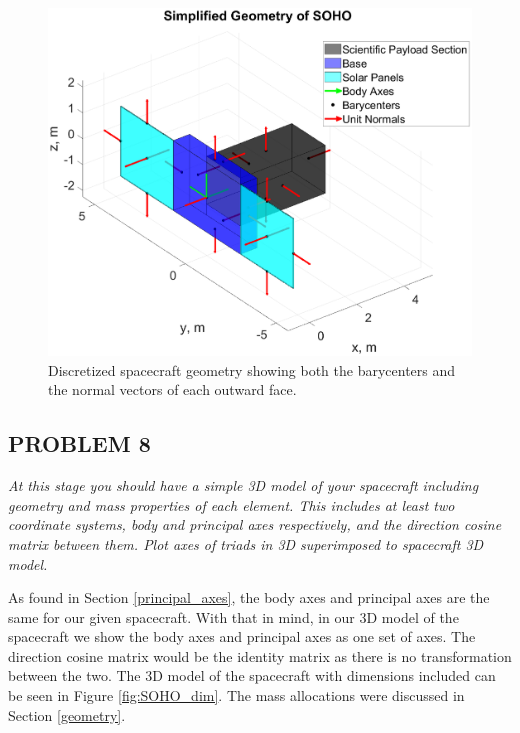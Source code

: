 \documentclass[12pt,a4paper,notitlepage]{article}
\begin{document}
\begin{figure}[H]
  \centering
    \includegraphics[width=\textwidth]{Images/SOHO_geo.eps}
  \caption{Discretized spacecraft geometry showing both the barycenters and the normal vectors of each outward face.}
  \label{fig:SOHO_disc}
\end{figure}

\subsection{PROBLEM 8}
\textit{At this stage you should have a simple 3D model of your spacecraft including geometry and mass properties of each element. This includes at least two coordinate systems, body and principal axes respectively, and the direction cosine matrix between them. Plot axes of triads in 3D superimposed to spacecraft 3D model.}

As found in Section \ref{principal_axes}, the body axes and principal axes are the same for our given spacecraft. With that in mind, in our 3D model of the spacecraft we show the body axes and principal axes as one set of axes. The direction cosine matrix would be the identity matrix as there is no transformation between the two. The 3D model of the spacecraft with dimensions included can be seen in Figure \ref{fig:SOHO_dim}. The mass allocations were discussed in Section \ref{geometry}. 
\end{document}
